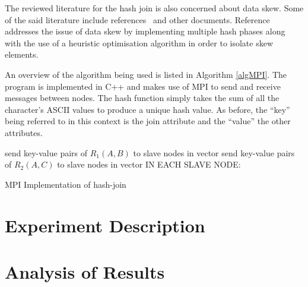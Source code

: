\documentclass[journal,draftclsnofoot]{IEEEtran}
\begin{document}
The reviewed literature for the hash join is also concerned about data skew. Some of the said literature include references~\cite{Wolf1990,Keller1991} and other documents. Reference~\cite{Wolf1990} addresses the issue of data skew by implementing multiple hash phases along with the use of a heuristic optimisation algorithm in order to isolate skew elements\cite{Wolf1990}.

An overview of the algorithm being used is listed in Algorithm \ref{algMPI}. The program is implemented in C++ and makes use of MPI to send and receive messages between nodes. The hash function simply takes the sum of all the character's ASCII values to produce a unique hash value. As before, the ``key'' being referred to in this context is the join attribute and the ``value'' the other attributes.
\begin{algorithm}
send key-value pairs of $R_{1}(A,B)$ to slave nodes in vector\;
send key-value pairs of $R_{2}(A,C)$ to slave nodes in vector\;
IN EACH SLAVE NODE:\\
 \caption{MPI Implementation of hash-join}
\label{algMPI}
\end{algorithm}
\section{Experiment Description}\label{desc}

\section{Analysis of Results}\label{ana}
\end{document}
